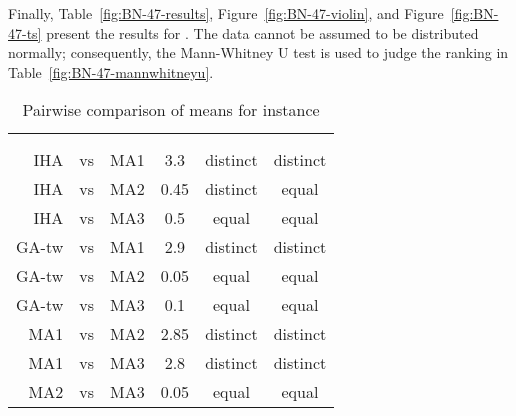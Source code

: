 \documentclass[thesis.tex]{subfiles}
\begin{document}
\subsubsection{}
   \renewcommand{\CurrentInstance}{\Instance{BN\textunderscore{}47}}
   \renewcommand{\CurrentInstanceFileEscaped}{BN-47}
   \renewcommand{\CurrentInstanceTexEscaped}{BN\textunderscore{}47}



Finally, Table~\vref{fig:BN-47-results}, Figure~\vref{fig:BN-47-violin}, and Figure~\vref{fig:BN-47-ts} present the results for \CurrentInstance. The data cannot be assumed to be distributed normally; consequently, the Mann-Whitney U test is used to judge the ranking in Table~\vref{fig:BN-47-mannwhitneyu}.
\begin{table}[htbp]
   \caption{Pairwise comparison of means for instance \CurrentInstance}
   \label{fig:\CurrentInstanceFileEscaped-mannwhitneyu}
   \centering\small
      \begin{tabular}{r@{\ }c@{\ }l S[table-format=2.2] c c} \toprule
         &&&                          &  \\ \cmidrule(lr){5-6}
         &&&  &  &  \\ \midrule

         \gls{IHA} &vs& \gls{MA1}   &  3.3  & distinct & distinct \\
         \gls{IHA} &vs& \gls{MA2}   &  0.45 & distinct &  equal   \\
         \gls{IHA} &vs& \gls{MA3}   &  0.5  &  equal   &  equal   \\
         \gls{GA-tw} &vs& \gls{MA1} &  2.9  & distinct & distinct \\
         \gls{GA-tw} &vs& \gls{MA2} &  0.05 &  equal   &  equal   \\
         \gls{GA-tw} &vs& \gls{MA3} &  0.1  &  equal   &  equal   \\
         \gls{MA1} &vs& \gls{MA2}   &  2.85 & distinct & distinct \\
         \gls{MA1} &vs& \gls{MA3}   &  2.8  & distinct & distinct \\
         \gls{MA2} &vs& \gls{MA3}   &  0.05 &  equal   &  equal   \\
         \bottomrule
      \end{tabular}
\end{table}
\end{document}
